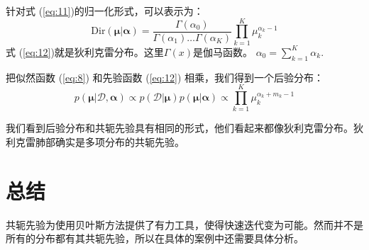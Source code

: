 \documentclass[10pt,a4paper,UTF8]{article}
\begin{document}
针对式 (\ref{eq:11})的归一化形式，可以表示为：
\begin{equation}
\label{eq:12}
\mathrm{Dir}( \mathbf{\mu} | \mathbf{\alpha} ) = \frac{ \Gamma(\alpha_{0}) }{ \Gamma(\alpha_{1})\ldots \Gamma(\alpha_{K}) } \prod_{k=1}^{K} \mu_{k}^{\alpha_{k} - 1}
\end{equation}
式 (\ref{eq:12})就是狄利克雷分布。这里\(\Gamma(x)\)是伽马函数。 \(\alpha_{0} = \sum_{k=1}^{K}\alpha_{k}\).

把似然函数 (\ref{eq:8}) 和先验函数 (\ref{eq:12}) 相乘，我们得到一个后验分布：
\begin{equation}
\label{eq:13}
p( \mathbf{\mu} | \mathcal{D}, \mathbf{\alpha} ) \propto p( \mathcal{D} | \mathbf{\mu} ) p( \mathbf{\mu} | \mathbf{\alpha} ) \propto \prod_{k=1}^{K} \mu_{k}^{\alpha_{k} + m_{k} -1}
\end{equation}

我们看到后验分布和共轭先验具有相同的形式，他们看起来都像狄利克雷分布。狄利克雷肺部确实是多项分布的共轭先验。
\section{总结}
\label{sec:orgc2749cf}


共轭先验为使用贝叶斯方法提供了有力工具，使得快速迭代变为可能。然而并不是所有的分布都有其共轭先验，所以在具体的案例中还需要具体分析。
\end{document}
